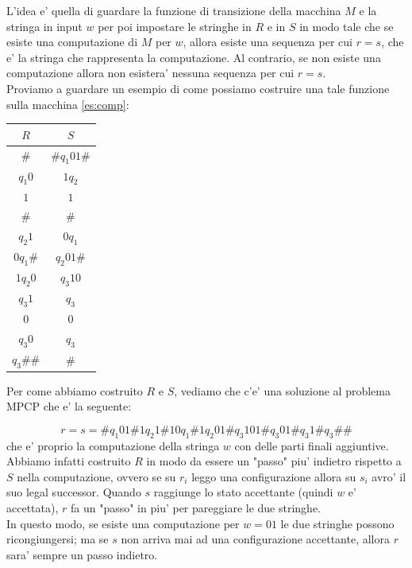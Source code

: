 L'idea e' quella di guardare la funzione di transizione della macchina $ M $ e la stringa in input $ w $ per poi impostare le stringhe in $ R $ e in $ S $ in modo tale che se esiste una computazione di $ M $ per $ w $, allora esiste una sequenza per cui $ r = s  $, che e' la stringa che rappresenta la computazione. Al contrario, se non esiste una computazione allora non esistera' nessuna sequenza per cui $ r = s  $.\\

Proviamo a guardare un esempio di come possiamo costruire una tale funzione sulla macchina \ref{es:comp}:

\begin{center}
  \begin{tabular}{c|c}
    $ R $ & $ S $ \\ \hline
    $ \# $ & $ \# q_1 01 \# $ \\
    $ q_1 0 $ & $ 1q_2 $\\
    $ 1 $ & $ 1 $\\
    $ \# $ & $ \# $\\
    $ q_2 1 $ & $ 0 q_1 $\\
    $ 0q_1\# $ & $ q_2 01\# $\\
    $ 1q_2 0 $ & $ q_3 1 0 $\\
    $ q_3 1 $ & $ q_3 $\\
    $ 0 $ & $ 0 $\\
    $ q_3 0 $ & $ q_3 $\\
    $ q_3 \#\# $ & $ \# $
  \end{tabular}
\end{center}

Per come abbiamo costruito $ R $ e $ S  $, vediamo che c'e' una soluzione al problema MPCP che e' la seguente:

\[
r = s = \# q_1 01 \# 1q_2 1 \# 10q_1 \# 1q_2 01 \# q_3 101 \# q_3 01 \# q_3 1 \# q_3 \# \# 
\]
che e' proprio la computazione della stringa $ w $ con delle parti finali aggiuntive.\\

Abbiamo infatti costruito $ R $ in modo da essere un "passo" piu' indietro rispetto a $ S  $ nella computazione, ovvero se su $ r_i $ leggo una configurazione allora su $ s_i $ avro' il suo legal successor. Quando $ s  $ raggiunge lo stato accettante (quindi $ w $ e' accettata), $ r $ fa un "passo" in piu' per pareggiare le due stringhe.\\

In questo modo, se esiste una computazione per $ w = 01 $ le due stringhe possono ricongiungersi; ma se $ s  $ non arriva mai ad una configurazione accettante, allora $ r $ sara' sempre un passo indietro.\\

